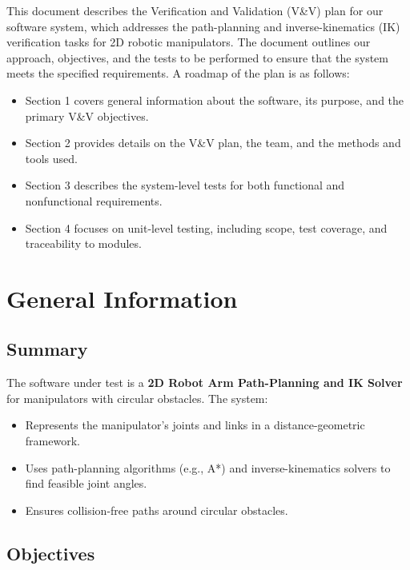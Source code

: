 \documentclass[12pt, titlepage]{article}
\begin{document}
This document describes the Verification and Validation (V\&V) plan for our software system, which addresses the path-planning and inverse-kinematics (IK) verification tasks for 2D robotic manipulators. The document outlines our approach, objectives, and the tests to be performed to ensure that the system meets the specified requirements. A roadmap of the plan is as follows:
\begin{itemize}
  \item Section 1 covers general information about the software, its purpose, and the primary V\&V objectives.
  \item Section 2 provides details on the V\&V plan, the team, and the methods and tools used.
  \item Section 3 describes the system-level tests for both functional and nonfunctional requirements.
  \item Section 4 focuses on unit-level testing, including scope, test coverage, and traceability to modules.
\end{itemize}

\section{General Information}

\subsection{Summary}
The software under test is a \textbf{2D Robot Arm Path-Planning and IK Solver} for manipulators with circular obstacles. The system:
\begin{itemize}
    \item Represents the manipulator’s joints and links in a distance-geometric framework.
    \item Uses path-planning algorithms (e.g., A*) and inverse-kinematics solvers to find feasible joint angles.
    \item Ensures collision-free paths around circular obstacles.
\end{itemize}



\subsection{Objectives}
\end{document}

